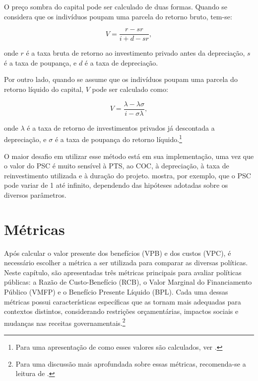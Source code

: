 \documentclass[12pt,letterpaper]{article}
\newcommand{\1}{\mathbbm{1}}
\numberwithin{equation}{section}
\begin{document}
O preço sombra do capital pode ser calculado de duas formas. Quando se considera que os indivíduos poupam uma parcela do retorno bruto, tem-se:

\begin{equation}
    V = \frac{r-sr}{i+d-sr},
\end{equation}

\noindent onde $r$ é a taxa bruta de retorno ao investimento privado antes da depreciação, $s$ é a taxa de poupança, e $d$ é a taxa de depreciação.

Por outro lado, quando se assume que os indivíduos poupam uma parcela do retorno líquido do capital, $V$ pode ser calculado como:

\begin{equation}
    V = \frac{\lambda-\lambda\sigma}{i-\sigma\lambda},
\end{equation}

\noindent onde $\lambda$ é a taxa de retorno de investimentos privados já descontada a depreciação, e $\sigma$ é a taxa de poupança do retorno líquido.\footnote{Para uma apresentação de como esses valores são calculados, ver \cite{lyon1990shadowprice}.}

O maior desafio em utilizar esse método está em sua implementação, uma vez que o valor do PSC é muito sensível à PTS, ao COC, à depreciação, à taxa de reinvestimento utilizada e à duração do projeto. \cite{lyon1990shadowprice} mostra, por exemplo, que o PSC pode variar de 1 até infinito, dependendo das hipóteses adotadas sobre os diversos parâmetros.

\section{Métricas}

Após calcular o valor presente dos benefícios (VPB) e dos custos (VPC), é necessário escolher a métrica a ser utilizada para comparar as diversas políticas. Neste capítulo, são apresentadas três métricas principais para avaliar políticas públicas: a Razão de Custo-Benefício (RCB), o Valor Marginal do Financiamento Público (VMFP) e o Benefício Presente Líquido (BPL). Cada uma dessas métricas possui características específicas que as tornam mais adequadas para contextos distintos, considerando restrições orçamentárias, impactos sociais e mudanças nas receitas governamentais.\footnote{Para uma discussão mais aprofundada sobre essas métricas, recomenda-se a leitura de \textcite{garcia_criteria_2022,garcia_three_2022,hendren_unified_2020,hendren_case_2022}.}
\end{document}
